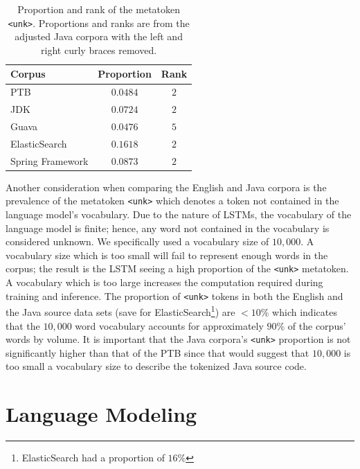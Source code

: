 \documentclass[runningheads,a4paper]{llncs}
\newcommand{\tabhorzspacing}{0.5em}
\newcommand{\tabvertspacing}{1.1}
\begin{document}
\begin{table}[t]
    \caption{Proportion and rank of the metatoken 
    \texttt{<unk>}. Proportions and ranks are from the adjusted Java corpora
    with the left and right curly braces removed.}
    \label{sample-table}
    \begin{center}
    \setlength{\tabcolsep}{\tabhorzspacing}
    {\renewcommand{\arraystretch}{\tabvertspacing}
    \begin{tabular}{lcc}
    \hline
    Corpus & Proportion & Rank\\
    \hline
    PTB                 & $0.0484$ & $2$ \\
    JDK                 & $0.0724$ & $2$ \\
    Guava               & $0.0476$ & $5$ \\
    ElasticSearch       & $0.1618$ & $2$ \\
    Spring Framework    & $0.0873$ & $2$  \\
    \hline
    \end{tabular}}
    \end{center}
    \vskip -7mm
\end{table}

Another consideration when comparing the English and Java corpora is the
prevalence of the metatoken \texttt{<unk>} which denotes a token not contained
in the language model's vocabulary.
Due to the nature of LSTMs, the vocabulary of the language model is finite;
hence, any word not contained in the vocabulary is considered unknown.
We specifically used a vocabulary size of $10,000$. A vocabulary size which
is too small will fail to represent enough words in the corpus; the result
is the LSTM seeing a high proportion of the \texttt{<unk>} metatoken. A
vocabulary which is too large increases the computation required during
training and inference.
The proportion of \texttt{<unk>} tokens in both the English and the Java
source data sets (save for ElasticSearch\footnote{ElasticSearch had a
proportion of $16\%$}) are $<10\%$ which indicates that
the $10,000$ word vocabulary accounts for approximately $90\%$ of the corpus'
words by volume. It is important that the Java corpora's \texttt{<unk>}
proportion is not significantly higher than that of the PTB since
that would suggest that $10,000$ is too small a vocabulary size to describe
the tokenized Java source code.

\section{Language Modeling}
\label{language-modeling}
\end{document}

